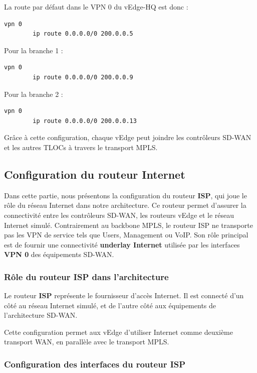 \documentclass[12pt,a4paper,oneside]{report}
\begin{document}
	La route par défaut dans le VPN 0 du vEdge-HQ est donc :
	
	\begin{lstlisting}[language=bash]
		vpn 0
		ip route 0.0.0.0/0 200.0.0.5
	\end{lstlisting}
	
	Pour la branche 1 :
	
	\begin{lstlisting}[language=bash]
		vpn 0
		ip route 0.0.0.0/0 200.0.0.9
	\end{lstlisting}
	
	Pour la branche 2 :
	
	\begin{lstlisting}[language=bash]
		vpn 0
		ip route 0.0.0.0/0 200.0.0.13
	\end{lstlisting}
	
	Grâce à cette configuration, chaque vEdge peut joindre les contrôleurs SD-WAN et les autres TLOCs à travers le transport MPLS.
	\subsection{Configuration du routeur Internet}
	
	Dans cette partie, nous présentons la configuration du routeur \textbf{ISP}, qui joue le rôle du réseau Internet dans notre architecture. Ce routeur permet d'assurer la connectivité entre les contrôleurs SD-WAN, les routeurs vEdge et le réseau Internet simulé. Contrairement au backbone MPLS, le routeur ISP ne transporte pas les VPN de service tels que Users, Management ou VoIP. Son rôle principal est de fournir une connectivité \textbf{underlay Internet} utilisée par les interfaces \textbf{VPN 0} des équipements SD-WAN.
	
	\subsubsection{Rôle du routeur ISP dans l'architecture}
	
	Le routeur \textbf{ISP} représente le fournisseur d'accès Internet. Il est connecté d'un côté au réseau Internet simulé, et de l'autre côté aux équipements de l'architecture SD-WAN.
	
	Cette configuration permet aux vEdge d'utiliser Internet comme deuxième transport WAN, en parallèle avec le transport MPLS.
	
	\subsubsection{Configuration des interfaces du routeur ISP}
	
\end{document}
